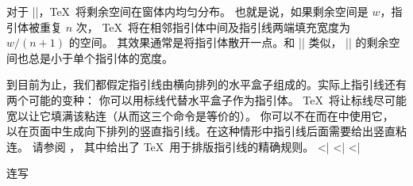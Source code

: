 {%
\li 对于 |\xleaders|，\TeX\ 将剩余空间在窗体内均匀分布。
也就是说，如果剩余空间是 $w$，指引体被重复 $n$ 次，
\TeX\ 将在相邻指引体中间及指引线两端填充宽度为 $w/(n+1)$ 的空间。
其效果通常是将指引体散开一点。和 |\cleaders| 类似，
|\xleaders| 的剩余空间也总是小于单个指引体的宽度。
\endulist

到目前为止，我们都假定指引线由横向排列的水平盒子组成的。实际上指引线还有两个可能的变种：
\olist
\li 你可以用标线代替水平盒子作为指引体。
\TeX\ 将让标线尽可能宽以让它填满该粘连（从而这三个命令是等价的）。
\li 你可以不在而在中使用它，
以在页面中生成向下排列的竖直指引线。在这种情形中指引线后面需要给出竖直粘连。
\endolist
\noindent
请参阅 ，
其中给出了 \TeX\ 用于排版指引线的精确规则。
\eix^^|\leaders|
\eix^^|\cleaders|
\eix^^|\xleaders|
\endconcept


\concept 连写

}
